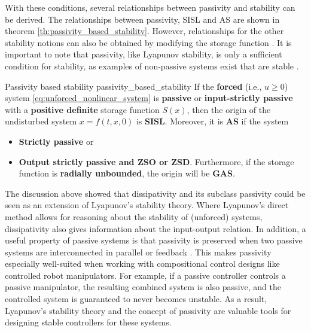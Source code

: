 With these conditions, several relationships between passivity and stability can be derived. The relationships between passivity, SISL and AS are shown in theorem \ref{th:passivity_based_stability}. However, relationships for the other stability notions can also be obtained by modifying the storage function \cite{haddadNonlinearDynamicalSystems2011}. It is important to note that passivity, like Lyapunov stability, is only a sufficient condition for stability, as examples of non-passive systems exist that are stable \cite{ngwompoPassivityAnalysisLinear2017}.
\begin{theorem}[list text=Passivity based stability,after pre=\footnotetext{Lemma 5.5-5.6 of \cite{khalilNonlinearControl2015} were combined and slightly adjusted for clarity.}]{Passivity based stability \cite{khalilNonlinearSystems2002}\footnotemark}{passivity_based_stability}
  If the \textbf{forced} (i.e., $u \ge 0$) system \eqref{eq:unforced_nonlinear_system} is \textbf{passive} or \textbf{input-strictly passive} with a \textbf{positive definite} storage function $S\left(x\right)$, then the origin of the undisturbed system $x=f\left(t, x, 0\right)$ is \textbf{SISL}. Moreover, it is \textbf{AS} if the system
  \begin{itemize}
    \item \textbf{Strictly passive} or
    \item \textbf{Output strictly passive and ZSO or ZSD}.
          Furthermore, if the storage function is \textbf{radially unbounded}, the origin will be \textbf{GAS}.
  \end{itemize}
\end{theorem}

The discussion above showed that dissipativity and its subclass passivity could be seen as an extension of Lyapunov's stability theory. Where Lyapunov's direct method allows for reasoning about the stability of (unforced) systems, dissipativity also gives information about the input-output relation. In addition, a useful property of passive systems is that passivity is preserved when two passive systems are interconnected in parallel or feedback \cite{haddadNonlinearDynamicalSystems2011}. This makes passivity especially well-suited when working with compositional control designs like controlled robot manipulators. For example, if a passive controller controls a passive manipulator, the resulting combined system is also passive, and the controlled system is guaranteed to never becomes unstable. As a result, Lyapunov's stability theory and the concept of passivity are valuable tools for designing stable controllers for these systems.

